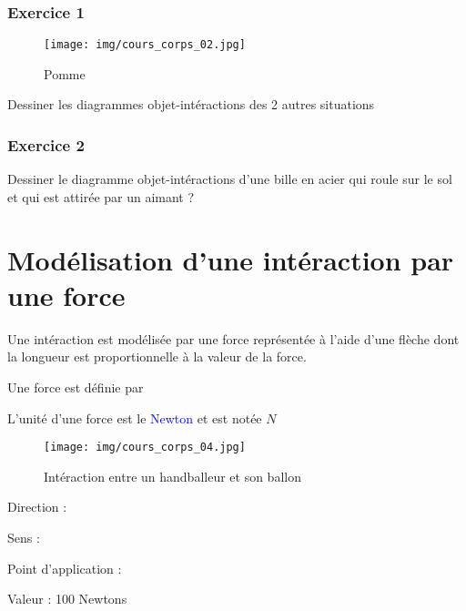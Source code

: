 \documentclass[a4paper,12pt]{article}
\begin{document}
\subsubsection*{Exercice 1}

\begin{figure}[H]
  \centering
  \texttt{[image: img/cours\_corps\_02.jpg]}
  \caption{\label{} Pomme}
\end{figure}

Dessiner les diagrammes objet-intéractions des 2 autres situations

\subsubsection*{Exercice 2}

Dessiner le diagramme objet-intéractions d'une bille en acier qui roule sur le sol et qui est attirée par un aimant ?

\section*{Modélisation d'une intéraction par une force}

\begin{tcolorbox}[colback=green!10!white, colframe=green!75!black, title=Méthode]
  Une intéraction est modélisée par une force représentée à l'aide d'une flèche dont la longueur est proportionnelle à la valeur de la force. \par 
  \vspace{1em}
  Une force est définie par 
  \begin{compactitem}
    \item 
    \item 
    \item 
    \item 
  \end{compactitem}
  \vspace{1em}
  L'unité d'une force est le \textcolor{blue}{Newton} et est notée $N$
\end{tcolorbox}

\begin{figure}[H]
  \centering
  \texttt{[image: img/cours\_corps\_04.jpg]}
  \caption{\label{} Intéraction entre un handballeur et son ballon}
\end{figure}

\begin{compactitem}
  \item Direction : 
  \item Sens : 
  \item Point d'application : 
  \item Valeur : 100 Newtons
\end{compactitem}
\end{document}

